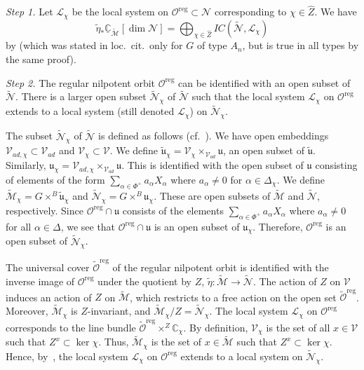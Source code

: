 \documentclass[reqno,11pt]{amsart}
\theoremstyle{remark}
\theoremstyle{remark}
\theoremstyle{definition}
\theoremstyle{definition}
\theoremstyle{definition}
\numberwithin{equation}{section}
\newcommand{\C}{\mathbb{C}}           %
\renewcommand{\ker}{\operatorname{ker }}
\newcommand{\fu}{{\mathfrak u}}
\newcommand{\ga}{\alpha}
\newcommand{\cl}{\mathcal{L}}
\newcommand{\cm}{\mathcal{M}}
\newcommand{\cn}{\mathcal{N}}
\newcommand{\co}{\mathcal{O}}
\newcommand{\toric}{\mathcal{V}}
\newcommand{\shc}{\underline{\C}}
\renewcommand{\tilde}{\widetilde}
\renewcommand{\hat}{\widehat}
\newcommand{\reg}{\mathrm{reg}}
\begin{document}
\medskip

 
{\em Step 1.}  Let $\cl_{\chi}$ be the local system on $\co^{\reg}\subset \cn$ corresponding to
$\chi \in \hat{Z}$. We have 
$$
\tilde{\eta}_* \shc_{\tilde{\cm}}[\dim \cn] = \bigoplus_{\chi \in \hat{Z}} IC(\tilde{\cn}, \cl_{\chi})
$$
by \cite[Prop.~3.19]{GPR23} (which was stated in loc.~cit.~only for $G$ of type $A_n$, but is true in all types by the same proof). 

\medskip

{\em Step 2.} The regular nilpotent orbit $\co^{\reg}$ can be identified with an open subset of $\tilde{\cn}$.   
There is a larger open subset  $\tilde{\cn}_{\chi}$ of $\tilde{\cn}$ such that the local system $\cl_{\chi}$ on $\co^{\reg}$ extends to a local system (still denoted $\cl_{\chi}$) on $\tilde{\cn}_{\chi}$.

The subset $\tilde{\cn}_{\chi}$ of $\tilde{\cn}$ is defined as follows (cf.~\cite[Prop.~3.17]{GPR23}).  We have open embeddings $\toric_{ad, \chi} \subset \toric_{ad}$ and $\toric_{\chi} \subset \toric$.  We define $\tilde{\fu}_{\chi} = {\toric_{\chi}} \times_{\toric_{ad}} \fu$, an open subset of $\tilde{\fu}$.  Similarly, $\fu_{\chi} = \toric_{ad, \chi} \times_{\toric_{ad}} \fu$.  This is identified with the open subset of $\fu$ consisting of elements of the form $\sum_{\ga \in \Phi^+} a_{\alpha} X_{\alpha} $ where $ a_{\ga} \neq 0$ for $\ga \in \Delta_{\chi}$.
We define $\tilde{\cm}_{\chi} = G \times^B \tilde{\fu}_{\chi}$ and $\tilde{\cn}_{\chi} = G \times^B \fu_{\chi}$.  These are open subsets of $\tilde{\cm}$ and $\tilde{\cn}$, respectively.
Since $\co^{\reg} \cap \fu$ consists of the elements  $\sum_{\ga \in \Phi^+} a_{\alpha} X_{\alpha} $ where $ a_{\ga} \neq 0$ for all $\ga \in \Delta$, we see that $\co^{\reg} \cap \fu$ is an open subset of $\fu_{\chi}$.  Therefore, $\co^{\reg}$ is an open subset of $\tilde{\cn}_{\chi}$.

The universal cover $\tilde{\co}^{\reg}$ of the regular nilpotent orbit is identified with the inverse image of $\co^{\reg}$ under the quotient by $Z$, $\tilde{\eta}: \tilde{\cm} \to \tilde{\cn}$. The action of $Z$ on $\toric$ induces an action of $Z$ on $\tilde{\cm}$, which restricts to a free action on the open set $\tilde{\co}^{\reg}$. Moreover, $\tilde{\cm}_{\chi}$ is $Z$-invariant, and $\tilde{\cm}_{\chi}/Z = \tilde{\cn}_{\chi} $. The local system $\cl_{\chi}$ on $\co^{\reg}$ corresponds to the line bundle $\tilde{\co}^{\reg} \times^Z \C_{\chi}$. By definition, $\toric_{\chi}$ is the set of all $x \in \toric$ such that $Z^x \subset \ker \chi$.  Thus, $\tilde{\cm}_{\chi}$ is the set of $x \in \tilde{\cm}$ such that $Z^x \subset \ker \chi$.  Hence, by~\cite[Prop.~3.5]{GPR23},  the local system $\cl_{\chi}$ on $\co^{\reg}$ extends to a local system on $\tilde{\cn}_{\chi} $.
\end{document}
